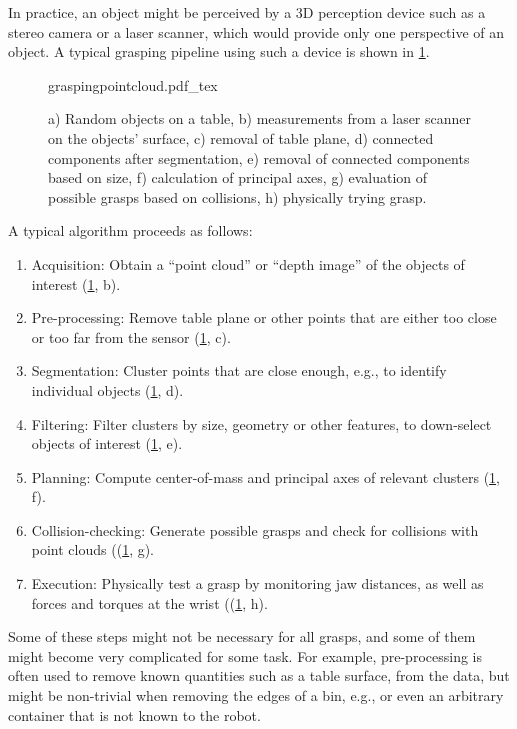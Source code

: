 In practice, an object might be perceived by a 3D perception device such as a stereo camera or a laser scanner, which would provide only one perspective of an object. A typical grasping pipeline using such a device is shown in \cref{fig:graspalgorithm}.

\begin{figure}
    \def\svgwidth{\textwidth}
    {graspingpointcloud.pdf_tex}
    \caption{a) Random objects on a table, b) measurements from a laser scanner on the objects' surface, c) removal of table plane, d) connected components after segmentation, e) removal of connected components based on size, f) calculation of principal axes, g) evaluation of possible grasps based on collisions, h) physically trying grasp.\label{fig:graspalgorithm}}
\end{figure}

A typical algorithm proceeds as follows:
\begin{enumerate}
\item Acquisition: Obtain a ``point cloud'' or ``depth image'' of the objects of interest (\cref{fig:graspalgorithm}, b).
\item Pre-processing: Remove table plane or other points that are either too close or too far from the sensor (\cref{fig:graspalgorithm}, c).
\item Segmentation: Cluster points that are close enough, e.g., to identify individual objects (\cref{fig:graspalgorithm}, d).
\item Filtering: Filter clusters by size, geometry or other features, to down-select objects of interest (\cref{fig:graspalgorithm}, e).
\item Planning: Compute center-of-mass and principal axes of relevant clusters (\cref{fig:graspalgorithm}, f).
\item Collision-checking: Generate possible grasps and check for collisions with point clouds ((\cref{fig:graspalgorithm}, g).
\item Execution: Physically test a grasp by monitoring jaw distances, as well as forces and torques at the wrist ((\cref{fig:graspalgorithm}, h).
\end{enumerate}

Some of these steps might not be necessary for all grasps, and some of them might become very complicated for some task. For example, pre-processing is often used to remove known quantities such as a table surface, from the data, but might be non-trivial when removing the edges of a bin, e.g., or even an arbitrary container that is not known to the robot. 

